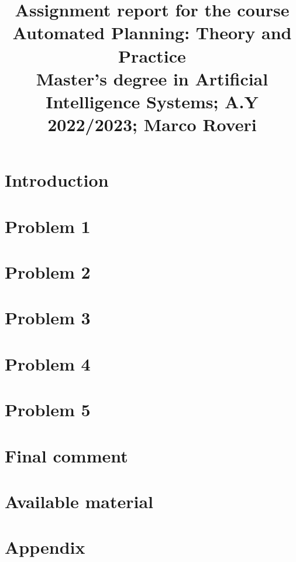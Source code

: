 \documentclass[conference]{IEEEtran}
\begin{document}
\title{Assignment report for the course\\ Automated Planning: Theory and Practice\\
{\footnotesize Master's degree in Artificial Intelligence Systems;
A.Y 2022/2023;
Marco Roveri}
}

\author{

\and
{}

}

\maketitle

\section{Introduction}

\section{Problem 1}

\section{Problem 2}

\section{Problem 3}

\section{Problem 4}

\section{Problem 5}

\section{Final comment}

\section{Available material}



\onecolumn

\section{Appendix}

\end{document}
